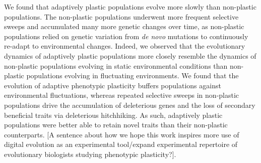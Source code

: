 We found that adaptively plastic populations evolve more slowly than non-plastic populations. 
The non-plastic populations underwent more frequent selective sweeps and accumulated many more genetic changes over time, as non-plastic populations relied on genetic variation from \textit{de novo} mutations to continuously re-adapt to environmental changes. 
Indeed, we observed that the evolutionary dynamics of adaptively plastic populations more closely resemble the dynamics of non-plastic populations evolving in static environmental conditions than non-plastic populations evolving in fluctuating environments.
We found that the evolution of adaptive phenotypic plasticity buffers populations against environmental fluctuations, whereas repeated selective sweeps in non-plastic populations drive the accumulation of deleterious genes and the loss of secondary beneficial traits via deleterious hitchhiking.
As such, adaptively plastic populations were better able to retain novel traits than their non-plastic counterparts.
[A sentence about how we hope this work inspires more use of digital evolution as an experimental tool/expand experimental repertoire of evolutionary biologists studying phenotypic plasticity?].
